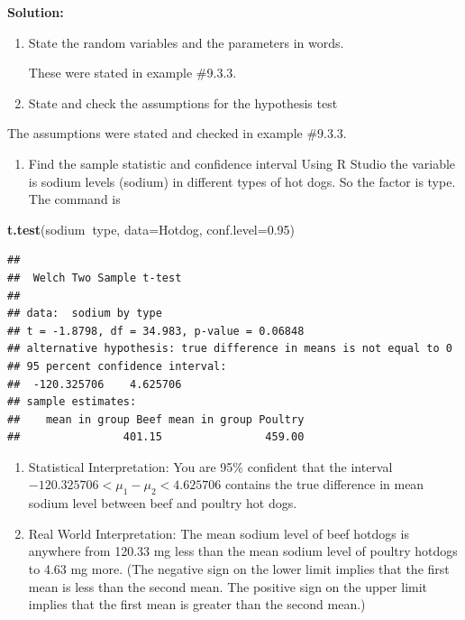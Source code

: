\documentclass[]{book}
\newenvironment{Shaded}{\begin{snugshade}}{\end{snugshade}}
\newcommand{\DataTypeTok}[1]{\textcolor[rgb]{0.13,0.29,0.53}{#1}}
\newcommand{\FloatTok}[1]{\textcolor[rgb]{0.00,0.00,0.81}{#1}}
\newcommand{\KeywordTok}[1]{\textcolor[rgb]{0.13,0.29,0.53}{\textbf{#1}}}
\newcommand{\NormalTok}[1]{#1}
\newcommand{\OperatorTok}[1]{\textcolor[rgb]{0.81,0.36,0.00}{\textbf{#1}}}
\providecommand{\tightlist}{%
  \setlength{\itemsep}{0pt}\setlength{\parskip}{0pt}}
\begin{document}
\textbf{Solution:}

\begin{enumerate}
\def\labelenumi{\arabic{enumi}.}
\item
  State the random variables and the parameters in words.

  These were stated in example \#9.3.3.
\item
  State and check the assumptions for the hypothesis test
\end{enumerate}

The assumptions were stated and checked in example \#9.3.3.

\begin{enumerate}
\def\labelenumi{\arabic{enumi}.}
\setcounter{enumi}{2}
\tightlist
\item
  Find the sample statistic and confidence interval
  Using R Studio the variable is sodium levels (sodium) in different types of hot dogs. So the factor is type. The command is
\end{enumerate}

\begin{Shaded}
\begin{Highlighting}[]
\KeywordTok{t.test}\NormalTok{(sodium}\OperatorTok{~}\NormalTok{type, }\DataTypeTok{data=}\NormalTok{Hotdog, }\DataTypeTok{conf.level=}\FloatTok{0.95}\NormalTok{)}
\end{Highlighting}
\end{Shaded}

\begin{verbatim}
## 
##  Welch Two Sample t-test
## 
## data:  sodium by type
## t = -1.8798, df = 34.983, p-value = 0.06848
## alternative hypothesis: true difference in means is not equal to 0
## 95 percent confidence interval:
##  -120.325706    4.625706
## sample estimates:
##    mean in group Beef mean in group Poultry 
##                401.15                459.00
\end{verbatim}

\begin{enumerate}
\def\labelenumi{\arabic{enumi}.}
\setcounter{enumi}{3}
\item
  Statistical Interpretation: You are 95\% confident that the interval \(-120.325706<\mu_1-\mu_2<4.625706\) contains the true difference in mean sodium level between beef and poultry hot dogs.
\item
  Real World Interpretation: The mean sodium level of beef hotdogs is anywhere from 120.33 mg less than the mean sodium level of poultry hotdogs to 4.63 mg more. (The negative sign on the lower limit implies that the first mean is less than the second mean. The positive sign on the upper limit implies that the first mean is greater than the second mean.)
\end{enumerate}
\end{document}
